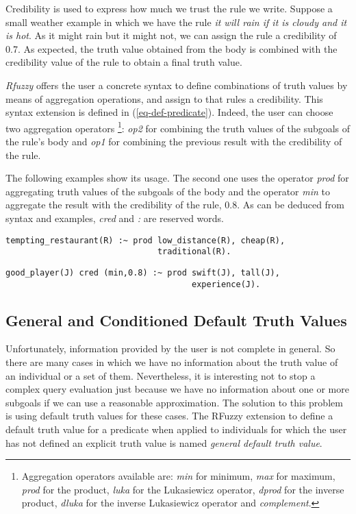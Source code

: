 \documentclass[runningheads,a4paper]{llncs}
\begin{document}
Credibility is used to 
express how much we trust the rule we write.
Suppose a small weather example in which we have the rule
{\it it will rain if it is cloudy and it is hot}. 
As it might rain but it might not, 
we can assign the rule a credibility of 0.7. 
As expected, the truth value obtained from the body is combined with
the credibility value of the rule to obtain a final truth value.

{\it Rfuzzy} offers the user a concrete syntax to define combinations 
of truth values by means of aggregation operations, and assign to 
that rules a credibility. 
This syntax extension is defined in (\ref{eq-def-predicate}).
Indeed, the user can choose two aggregation 
operators \footnote{Aggregation operators available are: 
{\it min} for minimum, {\it max} for maximum,
{\it prod} for the product, {\it luka} for the Lukasiewicz operator,
{\it dprod} for the inverse product, {\it dluka} for the inverse
Lukasiewicz operator and {\it complement}.}:
{\it op2} for combining the truth values of the subgoals of 
the rule's body and {\it op1} for combining the previous result 
with the credibility of the rule.




The following examples show its usage. The second one uses 
the operator {\it prod} for aggregating truth values of the subgoals
of the body and the operator {\it min} to aggregate the result with the 
credibility of the rule, 0.8. 
As can be deduced from syntax and examples, 
{\it cred} and {\it :} are reserved words.

\begin{verbatim}
tempting_restaurant(R) :~ prod low_distance(R), cheap(R), 
                               traditional(R).
\end{verbatim}
\begin{verbatim}
good_player(J) cred (min,0.8) :~ prod swift(J), tall(J), 
                                      experience(J).
\end{verbatim}

\subsection{General and Conditioned Default Truth Values}
\label{general-and-conditioned-default-truth-values}

Unfortunately, information provided by the user is not complete in
general. So there are many cases in which we have no information about
the truth value of an individual or a set of them. Nevertheless, it is
interesting not to stop a complex query evaluation just because we
have no information about one or more subgoals if we can use a
reasonable approximation. The solution to this problem is using
default truth values for these cases. The RFuzzy extension to define a
default truth value for a predicate when applied to individuals for
which the user has not defined an explicit truth value is named {\it
general default truth value}.  
\end{document}
